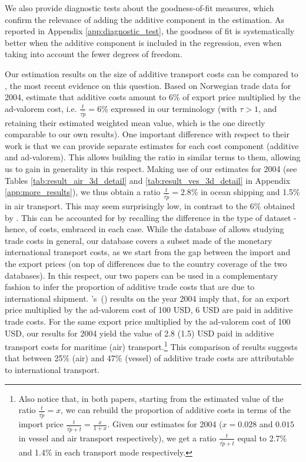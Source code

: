 \documentclass[a4paper,11pt]{article}
\newcommand\cites[1]{\citeauthor{#1}'s\ (\citeyear{#1})}
\begin{document}
We also provide diagnostic tests about the goodness-of-fit measures, which confirm the relevance of adding the additive component in the estimation. As reported in Appendix \ref{app:diagnostic_test}, the goodness of fit is systematically better when the additive component is included in the regression, even when taking into account the fewer degrees of freedom.\smallskip


Our estimation results on the size of additive transport costs can be compared to \cite{Irrazabal_2015}, the most recent evidence on this question.
Based on Norwegian trade data for 2004, \cite{Irrazabal_2015} estimate that additive costs amount to 6\% of export price multiplied by the ad-valorem cost, i.e.
$\frac{t}{\tau\widetilde{p}}=6\%$ expressed in our terminology (with $\tau>1$, and retaining their estimated weighted mean value, which is the one directly comparable to our own results).
One important difference with respect to their work is that we can provide separate estimates for each cost component (additive and ad-valorem).
This allows building the ratio in similar terms to them, allowing us to gain in generality in this respect.
Making use of our estimates for 2004 (see Tables \ref{tab:result_air_3d_detail} and \ref{tab:result_ves_3d_detail} in Appendix \ref{app:more_results}), we thus obtain a ratio $\frac{t}{\tau\widetilde{p}}=2.8\%$ in ocean shipping and 1.5\% in air transport.
This may seem surprisingly low, in contrast to the 6\% obtained by \cite{Irrazabal_2015}.
This can be accounted for by recalling the difference in the type of dataset - hence, of costs, embraced in each case.
While the database of \cite{Irrazabal_2015} allows studying trade costs in general, our database covers a subset made of the monetary international transport costs, as we start from the gap between the import and the export prices (on top of differences due to the country coverage of the two databases).
In this respect, our two papers can be used in a complementary fashion to infer the proportion of additive trade costs that are due to international shipment.
\cites{Irrazabal_2015} results on the year 2004 imply that, for an export price multiplied by the ad-valorem cost of 100 USD, 6 USD are paid in additive trade costs.
For the same export price multiplied by the ad-valorem cost of 100 USD, our results for 2004 yield the value of 2.8 (1.5) USD paid in additive transport costs for maritime (air) transport.\footnote{Also notice that, in both papers, starting from the estimated value of the ratio $\frac{t}{\tau \widetilde{p}}= x$, we can rebuild the proportion of additive costs in terms of the import price $\frac{t}{\tau \widetilde{p} + t} = \frac{x}{1+x}$.
Given our estimates for 2004 ($x = 0.028$ and $0.015$ in vessel and air transport respectively), we get a ratio $\frac{t}{\tau \widetilde{p} + t}$ equal to 2.7\% and 1.4\% in each transport mode respectively.} This comparison of results suggests that between 25\% (air) and 47\% (vessel) of additive trade costs are attributable to international transport.
\end{document}
